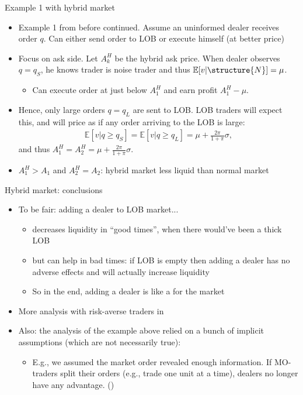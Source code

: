 \documentclass[english,10pt
,aspectratio=169
]{beamer}
\begin{document}
\begin{frame}{Example 1 with hybrid market}
	\begin{itemize}
		\item Example 1 from before continued. Assume an uninformed dealer receives order $q$. Can either send order to LOB or execute himself (at better price) 
		\pause
		\item Focus on ask side. Let $A^H_k$ be the hybrid ask price. When dealer observes $q=q_S$, he knows trader is noise trader and thus $\mathbb{E}[v|\structure{N}]=\mu$. 
		\begin{itemize}
			\item Can execute order at just below $A^H_1$ and earn profit $A^H_1-\mu$.
		\end{itemize}
		\pause
		\item Hence, only large orders $q=q_L$ are sent to LOB. LOB traders will expect this, and will price as if any order arriving to the LOB is large:
		\begin{align*}
			\mathbb{E}[v|q \ge q_S]=\mathbb{E}[v|q \ge q_L]=\mu+\frac{2\pi}{1+\pi} \sigma,
		\end{align*}
		and thus $A^H_1=A^H_2=\mu+\frac{2\pi}{1+\pi} \sigma$.
		\item $A^H_1>A_1$ and $A^H_2=A_2$: hybrid market less liquid than normal market
	\end{itemize}
\end{frame}


\begin{frame}{Hybrid market: conclusions}
	\begin{itemize}
		\item To be fair: adding a dealer to LOB market... 
		\begin{itemize}
			\item decreases liquidity in ``good times'', when there would've been a thick LOB
			\item but can help in bad times: if LOB is empty then adding a dealer has no adverse effects and will actually increase liquidity
			\item So in the end, adding a dealer is like a  for the market
		\end{itemize}
		\item More analysis with risk-averse traders in \cite{viswanathan_market_2002}
		\item Also: the analysis of the example above relied on a bunch of implicit assumptions (which are not necessarily true):
		\begin{itemize}
			\item E.g., we assumed the market order revealed enough information. If MO-traders split their orders (e.g., trade one unit at a time), dealers no longer have any advantage. (\cite{back_working_2007})
		\end{itemize}
	\end{itemize}
\end{frame}
\end{document}
